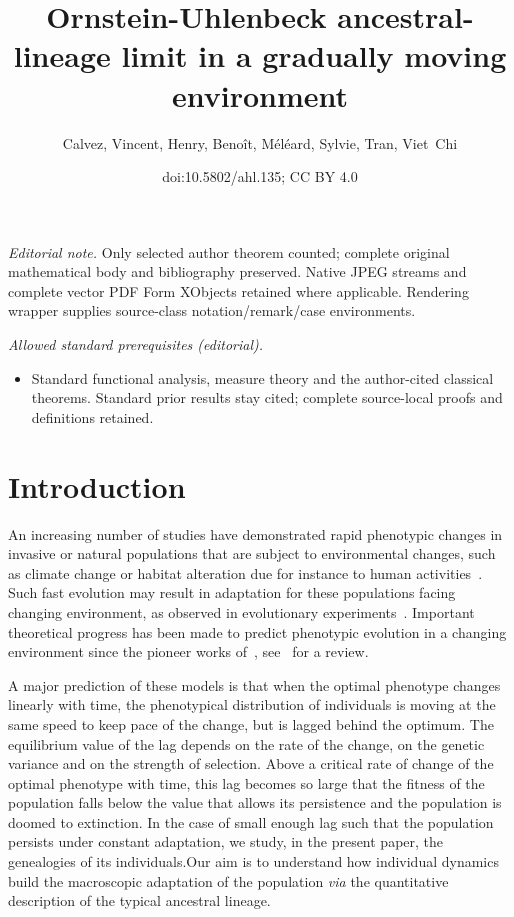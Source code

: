 \documentclass[10pt]{amsart}
\title{Ornstein-Uhlenbeck ancestral-lineage limit in a gradually moving environment}
\author{Calvez, Vincent, Henry, Benoît, Méléard, Sylvie, Tran, Viet Chi}
\date{doi:10.5802/ahl.135; CC BY 4.0}
\theoremstyle{definition}\newtheorem{defi}[theo]{Definition}\newtheorem{rema}[theo]{Remark}\newtheorem{exam}[theo]{Example}\newtheorem{exem}[theo]{Example}\newtheorem{nota}[theo]{Notation}
\begin{document}
\maketitle
\noindent\textit{Editorial note.} Only selected author theorem counted; complete original mathematical body and bibliography preserved. Native JPEG streams and complete vector PDF Form XObjects retained where applicable. Rendering wrapper supplies source-class notation/remark/case environments.\par\medskip
\noindent\textit{Allowed standard prerequisites (editorial).}\begin{itemize}
\item Standard functional analysis, measure theory and the author-cited classical theorems. Standard prior results stay cited; complete source-local proofs and definitions retained.
\end{itemize}\medskip



\section{Introduction}

An increasing number of studies have demonstrated rapid phenotypic changes in invasive or natural populations that are subject to environmental changes, such as climate change or habitat alteration due for instance to human activities~\cite{anderson_evolutionary_2012,BraHol06,burrows_pace_2011,Hen08,HofSgr11,Par06,sheldon_climate_2019}. Such fast evolution may result in adaptation for these populations facing changing environment, as observed in evolutionary experiments~\cite{Col18,GorAarZwa16,guzella_slower_2018,Gon13}. Important theoretical progress has been made to predict phenotypic evolution in a changing environment since the pioneer works of~\cite{BurLyn95,LynGabWoo91,LynLan93,LanSha96}, see~\cite{KopMat13} for a review.



A major prediction of these models is that when the optimal phenotype changes linearly with time, the phenotypical distribution of individuals is moving at the same speed to keep pace of the change, but is lagged behind the optimum. The equi\-librium value of the lag depends on the rate of the change, on the genetic variance and on the strength of selection. Above a critical rate of change of the optimal phenotype with time, this lag becomes so large that the fitness of the population falls below the value that allows its persistence and the population is doomed to extinction. In the case of small enough lag such that the population persists under constant adaptation, we study, in the present paper, the genealogies of its individuals.\linebreak Our aim is to understand how individual dynamics build the macroscopic adaptation of the population \emph{via} the quantitative description of the typical ancestral lineage.
\end{document}
